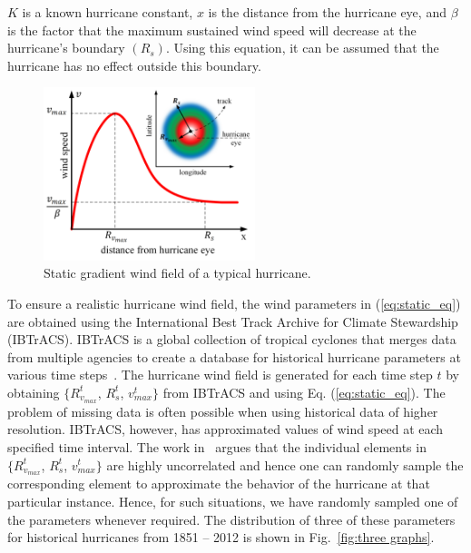 \noindent
$K$ is a known hurricane constant, $x$ is the distance from the hurricane eye, and $\beta$ is the factor that the maximum sustained wind speed will decrease at the hurricane’s boundary $(R_s)$. Using this equation, it can be assumed that the hurricane has no effect outside this boundary.

\begin{figure}[t]
    \centering
    \includegraphics[width=0.55\textwidth]{figures/hurricane_wind_field.png}
    \caption{Static gradient wind field of a typical hurricane.}
    \label{fig:static_hurricane}
\end{figure}

To ensure a realistic hurricane wind field, the wind parameters in (\ref{eq:static_eq}) are obtained using the International Best Track Archive for Climate Stewardship (IBTrACS). IBTrACS is a global collection of tropical cyclones that merges data from multiple agencies to create a database for historical hurricane parameters at various time steps~\cite{Knapp2010}. The hurricane wind field is generated for each time step $t$ by obtaining $\{R_{v_{max}}^t$, $R_{s}^t$, $v_{max}^t\}$ from IBTrACS and using Eq. (\ref{eq:static_eq}). The problem of missing data is often possible when using historical data of higher resolution. IBTrACS, however, has approximated values of wind speed at each specified time interval. The work in~\cite{javanbakht2014risk} argues that the individual elements in $\{R_{v_{max}}^t$, $R_{s}^t$, $v_{max}^t\}$ are highly uncorrelated and hence one can randomly sample the corresponding element to approximate the behavior of the hurricane at that particular instance. Hence, for such situations, we have randomly sampled one of the parameters whenever required. The distribution of three of these parameters for historical hurricanes from 1851 -- 2012 is shown in Fig.~\ref{fig:three graphs}.       

